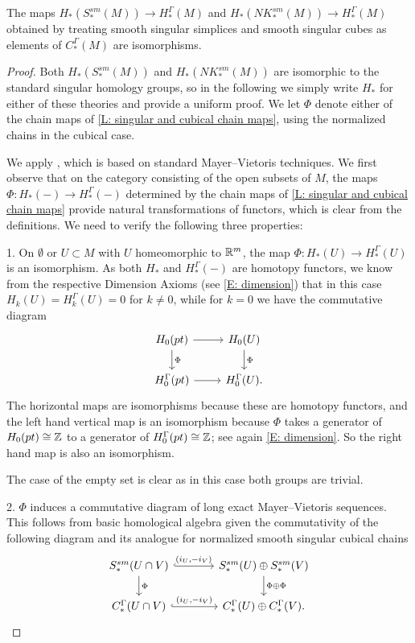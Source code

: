 \begin{theorem}\label{T: hom iso map}
	The maps $H_*(S^{sm}_*(M)) \to H_*^\Gamma(M)$ and $H_*(NK^{sm}_*(M)) \to H_*^\Gamma(M)$ obtained by treating smooth singular simplices and smooth singular cubes as elements of $C_*^\Gamma(M)$ are isomorphisms.
\end{theorem}

\begin{proof}
	Both $H_*(S^{sm}_*(M))$ and $H_*(NK^{sm}_*(M))$ are isomorphic to the standard singular homology groups, so in the following we simply write $H_*$ for either of these theories and provide a uniform proof.
	We let $\Phi$ denote either of the chain maps of \cref{L: singular and cubical chain maps}, using the normalized chains in the cubical case.

	We apply \cite[Theorem 5.1.1]{Frie20}, which is based on standard Mayer--Vietoris techniques.
	We first observe that on the category consisting of the open subsets of $M$, the maps $\Phi: H_*(-) \to H_*^\Gamma(-)$ determined by the chain maps of \cref{L: singular and cubical chain maps} provide natural transformations of functors, which is clear from the definitions.
	We need to verify the following three properties:

	1.
	On $\emptyset$ or $U \subset M$ with $U$ homeomorphic to $\mathbb{R}^m$, the map $\Phi: H_*(U) \to H_*^\Gamma(U)$ is an isomorphism.
	As both $H_*$ and $H_*^\Gamma(-)$ are homotopy functors, we know from the respective Dimension Axioms (see \cref{E: dimension}) that in this case $H_k(U) = H_k^\Gamma(U) = 0$ for $k\neq 0$, while for $k = 0$ we have the commutative diagram
	\[
	\begin{tikzcd}
		H_0(pt) \arrow[r] \arrow[d, "\Phi"] & H_0(U) \arrow[d, "\Phi"] \\
		H_0^\Gamma(pt) \arrow[r] & H^\Gamma_0(U).
	\end{tikzcd}
	\]
	The horizontal maps are isomorphisms because these are homotopy functors, and the left hand vertical map is an isomorphism because $\Phi$ takes a generator of $H_0(pt) \cong \mathbb{Z}$ to a generator of $H_0^\Gamma(pt) \cong \mathbb{Z}$; see again \cref{E: dimension}.
	So the right hand map is also an isomorphism.

	The case of the empty set is clear as in this case both groups are trivial.

	2.
	$\Phi$ induces a commutative diagram of long exact Mayer--Vietoris sequences.
	This follows from basic homological algebra given the commutativity of the following diagram and its analogue for normalized smooth singular cubical chains
	\[
	\begin{tikzcd}[column sep=large]
		S^{sm}_*(U \cap V) \arrow[r, "{(i_U, -i_V)}", hook] \arrow[d, "\Phi"] & S^{sm}_*(U) \oplus S^{sm}_*(V) \arrow[d, "\Phi \oplus \Phi"] \\
		C_*^\Gamma(U \cap V) \arrow[r, "{(i_U, -i_V)}", hook] & C_*^\Gamma(U) \oplus C_*^\Gamma(V).
	\end{tikzcd}
	\]


\end{proof}
